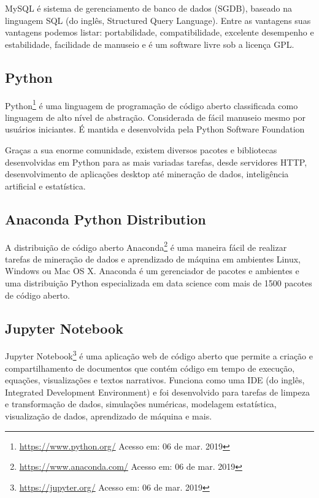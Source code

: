 MySQL é sistema de gerenciamento de banco de dados (SGDB), baseado na linguagem
SQL (do inglês, Structured Query Language). Entre as vantagens suas vantagens
podemos listar: portabilidade, compatibilidade, excelente desempenho e
estabilidade, facilidade de manuseio e é um software livre sob a licença GPL.

\subsection{Python}

Python\footnote{\url{https://www.python.org/} Acesso em: 06 de mar. 2019} é uma
linguagem de programação de código aberto classificada como linguagem de alto
nível de abstração. Considerada de fácil manuseio mesmo por usuários iniciantes.
É mantida e desenvolvida pela Python Software Foundation

Graças a sua enorme comunidade, existem diversos pacotes e bibliotecas
desenvolvidas em Python para as mais variadas tarefas, desde servidores HTTP,
desenvolvimento de aplicações desktop até mineração de dados, inteligência
artificial e estatística.

\subsection{Anaconda Python Distribution}

A distribuição de código aberto
Anaconda\footnote{\url{https://www.anaconda.com/} Acesso em: 06 de mar. 2019}  é
uma maneira fácil de realizar tarefas de mineração de dados e aprendizado de
máquina em ambientes Linux, Windows ou Mac OS X. Anaconda é um gerenciador de
pacotes e ambientes e uma distribuição Python especializada em data science com
mais de 1500 pacotes de código aberto.

\subsection{Jupyter Notebook}

Jupyter Notebook\footnote{\url{https://jupyter.org/} Acesso em: 06 de mar. 2019}
é uma aplicação web de código aberto que permite a criação e compartilhamento de
documentos que contém código em tempo de execução, equações, visualizações e
textos narrativos. Funciona como uma IDE (do inglês, Integrated Development
Environment) e foi desenvolvido para tarefas de limpeza e transformação de
dados, simulações numéricas, modelagem estatística, visualização de dados,
aprendizado de máquina e mais.

